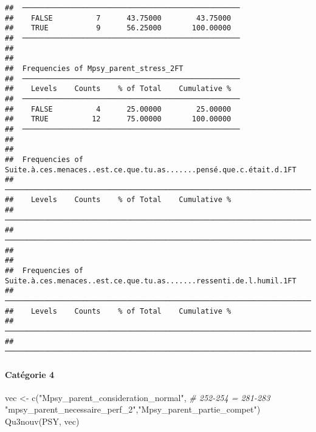 \documentclass[
]{article}
\newenvironment{Shaded}{\begin{snugshade}}{\end{snugshade}}
\newcommand{\CommentTok}[1]{\textcolor[rgb]{0.56,0.35,0.01}{\textit{#1}}}
\newcommand{\FunctionTok}[1]{\textcolor[rgb]{0.00,0.00,0.00}{#1}}
\newcommand{\NormalTok}[1]{#1}
\newcommand{\OtherTok}[1]{\textcolor[rgb]{0.56,0.35,0.01}{#1}}
\newcommand{\StringTok}[1]{\textcolor[rgb]{0.31,0.60,0.02}{#1}}
\begin{document}
\begin{verbatim}
##  ────────────────────────────────────────────────── 
##    FALSE          7      43.75000        43.75000   
##    TRUE           9      56.25000       100.00000   
##  ────────────────────────────────────────────────── 
## 
## 
##  Frequencies of Mpsy_parent_stress_2FT              
##  ────────────────────────────────────────────────── 
##    Levels    Counts    % of Total    Cumulative %   
##  ────────────────────────────────────────────────── 
##    FALSE          4      25.00000        25.00000   
##    TRUE          12      75.00000       100.00000   
##  ────────────────────────────────────────────────── 
## 
## 
##  Frequencies of Suite.à.ces.menaces..est.ce.que.tu.as.......pensé.que.c.était.d.1FT 
##  ────────────────────────────────────────────────────────────────────────────────── 
##    Levels    Counts    % of Total    Cumulative %   
##  ────────────────────────────────────────────────────────────────────────────────── 
##  ────────────────────────────────────────────────────────────────────────────────── 
## 
## 
##  Frequencies of Suite.à.ces.menaces..est.ce.que.tu.as.......ressenti.de.l.humil.1FT 
##  ────────────────────────────────────────────────────────────────────────────────── 
##    Levels    Counts    % of Total    Cumulative %   
##  ────────────────────────────────────────────────────────────────────────────────── 
##  ──────────────────────────────────────────────────────────────────────────────────
\end{verbatim}

\hypertarget{catuxe9gorie-4-2}{%
\paragraph{Catégorie 4}\label{catuxe9gorie-4-2}}

\begin{Shaded}
\begin{Highlighting}[]
\NormalTok{vec }\OtherTok{\textless{}{-}} \FunctionTok{c}\NormalTok{(}\StringTok{"Mpsy\_parent\_consideration\_normal"}\NormalTok{,   }\CommentTok{\# 252{-}254 = 281{-}283}
         \StringTok{"mpsy\_parent\_necessaire\_perf\_2"}\NormalTok{,}\StringTok{"Mpsy\_parent\_partie\_compet"}\NormalTok{)}
\FunctionTok{Qu3nouv}\NormalTok{(PSY, vec)}
\end{Highlighting}
\end{Shaded}
\end{document}
